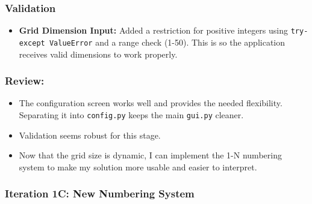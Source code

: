\subsubsection{Validation}
\begin{itemize}
	\item \textbf{Grid Dimension Input:} Added a restriction for positive integers using \verb|try-except ValueError| and a range check (1-50). This is so the application receives valid dimensions to work properly.
\end{itemize}



\subsubsection{Review:}
\begin{itemize}
	\item The configuration screen works well and provides the needed flexibility. Separating it into \verb|config.py| keeps the main \verb|gui.py| cleaner.
	\item Validation seems robust for this stage.
	\item Now that the grid size is dynamic, I can implement the 1-N numbering system to make my solution more usable and easier to interpret.
\end{itemize}

\newpage

\subsubsection{Iteration 1C: New Numbering System}

